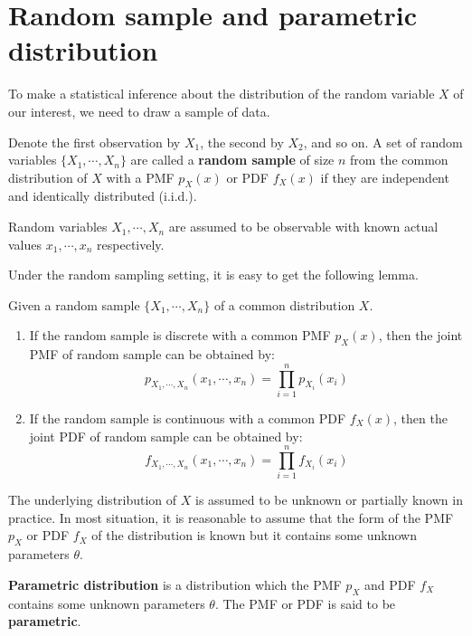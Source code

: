 \documentclass{huhtakm-template-book-v2}
\begin{document}
\newpage
\section{Random sample and parametric distribution}
To make a statistical inference about the distribution of the random variable $X$ of our interest, we need to draw a sample of data.
\begin{defn}
	Denote the first observation by $X_{1}$, the second by $X_{2}$, and so on. A set of random variables $\{X_{1},\cdots,X_{n}\}$ are called a \textbf{random sample} of size $n$ from the common distribution of $X$ with a PMF $p_{X}(x)$ or PDF $f_{X}(x)$ if they are independent and identically distributed (i.i.d.).
\end{defn}
\begin{rem}
	Random variables $X_{1},\cdots,X_{n}$ are assumed to be observable with known actual values $x_{1},\cdots,x_{n}$ respectively.
\end{rem}
Under the random sampling setting, it is easy to get the following lemma.
\begin{lem}
	Given a random sample $\{X_{1},\cdots,X_{n}\}$ of a common distribution $X$.
	\begin{enumerate}
		\item If the random sample is discrete with a common PMF $p_{X}(x)$, then the joint PMF of random sample can be obtained by:
		\begin{equation*}
			p_{X_{1},\cdots,X_{n}}(x_{1},\cdots,x_{n})=\prod_{i=1}^{n}p_{X_{i}}(x_{i})
		\end{equation*}
		\item If the random sample is continuous with a common PDF $f_{X}(x)$, then the joint PDF of random sample can be obtained by:
		\begin{equation*}
			f_{X_{1},\cdots,X_{n}}(x_{1},\cdots,x_{n})=\prod_{i=1}^{n}f_{X_{i}}(x_{i})
		\end{equation*}
	\end{enumerate}
\end{lem}
The underlying distribution of $X$ is assumed to be unknown or partially known in practice. In most situation, it is reasonable to assume that the form of the PMF $p_{X}$ or PDF $f_{X}$ of the distribution is known but it contains some unknown parameters $\theta$.
\begin{defn}
	\textbf{Parametric distribution} is a distribution which the PMF $p_{X}$ and PDF $f_{X}$ contains some unknown parameters $\theta$. The PMF or PDF is said to be \textbf{parametric}.
\end{defn}
\end{document}
